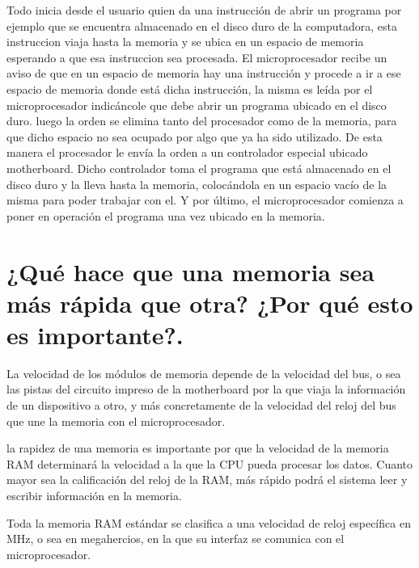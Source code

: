 \documentclass{article}
\begin{document}
\vspace{0.5cm}

Todo inicia desde el usuario quien da una instrucción de abrir un programa por ejemplo que se encuentra almacenado en el disco duro de la computadora, esta instruccion viaja hasta la memoria y se ubica en un espacio de memoria esperando a que esa instruccion sea procesada. El microprocesador recibe un aviso de que en un espacio de memoria hay una instrucción y procede a ir a ese espacio de memoria donde está dicha instrucción, la misma es leída por el microprocesador indicáncole que debe abrir un programa ubicado en el disco duro. luego la orden se elimina tanto del procesador como de la memoria, para que dicho espacio no sea ocupado por algo que ya ha sido utilizado. De esta manera el procesador le envía la orden a un controlador especial ubicado motherboard. Dicho controlador toma el programa que está almacenado en el disco duro y la lleva hasta la memoria, colocándola en un espacio vacío de la misma para poder trabajar con el. Y por último, el microprocesador comienza a poner en operación el programa una vez ubicado en la memoria.

\section{¿Qué hace que una memoria sea más rápida que otra? ¿Por qué esto es importante?.}

\vspace{0.5cm}

La velocidad de los módulos de memoria depende de la velocidad del bus, o sea las pistas del circuito impreso de la motherboard por la que viaja la información de un dispositivo a otro, y más concretamente de la velocidad del reloj del bus que une la memoria con el microprocesador. \cite{MemoriaDelComputador}

\vspace{0.5cm}

la rapidez de una memoria es importante por que la velocidad de la memoria RAM determinará la velocidad a la que la CPU pueda procesar los datos. Cuanto mayor sea la calificación del reloj de la RAM, más rápido podrá el sistema leer y escribir información en la memoria.\cite{TarjetasGraficasPC}

\vspace{0.5cm}

Toda la memoria RAM estándar se clasifica a una velocidad de reloj específica en MHz, o sea en megahercios, en la que su interfaz se comunica con el microprocesador. \cite{TarjetasGraficasPC}
\end{document}
